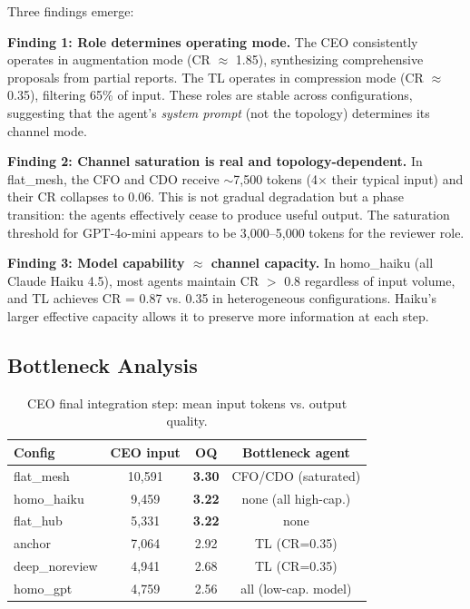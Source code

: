 \documentclass[conference]{IEEEtran}
\begin{document}
Three findings emerge:

\textbf{Finding 1: Role determines operating mode.}
The CEO consistently operates in augmentation mode (CR $\approx$ 1.85), synthesizing comprehensive proposals from partial reports.
The TL operates in compression mode (CR $\approx$ 0.35), filtering 65\% of input.
These roles are stable across configurations, suggesting that the agent's \emph{system prompt} (not the topology) determines its channel mode.

\textbf{Finding 2: Channel saturation is real and topology-dependent.}
In flat\_mesh, the CFO and CDO receive $\sim$7,500 tokens (4$\times$ their typical input) and their CR collapses to 0.06.
This is not gradual degradation but a phase transition: the agents effectively cease to produce useful output.
The saturation threshold for GPT-4o-mini appears to be 3,000--5,000 tokens for the reviewer role.

\textbf{Finding 3: Model capability $\approx$ channel capacity.}
In homo\_haiku (all Claude Haiku 4.5), most agents maintain CR $>$ 0.8 regardless of input volume, and TL achieves CR = 0.87 vs. 0.35 in heterogeneous configurations.
Haiku's larger effective capacity allows it to preserve more information at each step.

\subsection{Bottleneck Analysis}

\begin{table}[t]
\centering
\caption{CEO final integration step: mean input tokens vs. output quality.}
\label{tab:bottleneck}
\small
\begin{tabular}{lccc}
\toprule
\textbf{Config} & \textbf{CEO input} & \textbf{OQ} & \textbf{Bottleneck agent} \\
\midrule
flat\_mesh   & 10,591 & \textbf{3.30} & CFO/CDO (saturated) \\
homo\_haiku  & 9,459  & \textbf{3.22} & none (all high-cap.) \\
flat\_hub    & 5,331  & \textbf{3.22} & none \\
anchor       & 7,064  & 2.92          & TL (CR=0.35) \\
deep\_noreview & 4,941 & 2.68         & TL (CR=0.35) \\
homo\_gpt    & 4,759  & 2.56          & all (low-cap. model) \\
\bottomrule
\end{tabular}
\end{table}
\end{document}
